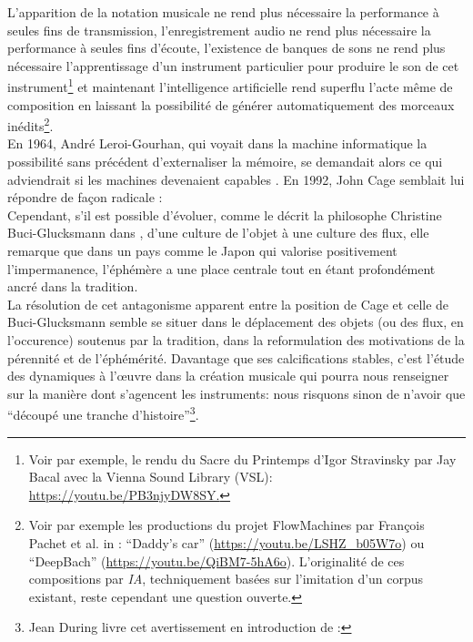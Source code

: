 \noindent L’apparition de la notation musicale ne rend plus nécessaire la performance à seules fins de transmission, l’enregistrement audio ne rend plus nécessaire la performance à seules fins d’écoute, l’existence de banques de sons ne rend plus nécessaire l’apprentissage d’un instrument particulier pour produire le son de cet instrument\footnote{Voir par exemple, le rendu du Sacre du Printemps d'Igor Stravinsky par Jay Bacal avec la Vienna Sound Library (VSL): \url{https://youtu.be/PB3njyDW8SY.}} et maintenant l’intelligence artificielle rend superflu l'acte même de composition en laissant la possibilité de générer automatiquement des morceaux inédits\footnote{Voir par exemple les productions du projet FlowMachines par François Pachet et al. in \cite{hadjeres_deepbach:_2016}: “Daddy's car” (\url{https://youtu.be/LSHZ_b05W7o}) ou “DeepBach” (\url{https://youtu.be/QiBM7-5hA6o}). L'originalité de ces compositions par \textit{IA}, techniquement basées sur l'imitation d'un corpus existant, reste cependant une question ouverte.}.\\
\indent En 1964, André Leroi-Gourhan, qui voyait dans la machine informatique la possibilité sans précédent d'externaliser la mémoire, se demandait alors ce qui adviendrait si les machines devenaient capables  \cite{leroi-gourhan_geste_1964}. En 1992, John Cage semblait lui répondre de façon radicale :  \cite{sebestik_ecoute_1992}\\
\indent Cependant, s'il est possible d'évoluer, comme le décrit la philosophe Christine Buci-Glucksmann dans \cite{buci-glucksmann_esthetique_2003}, d'une culture de l'objet à une culture des flux, elle remarque que dans un pays comme le Japon qui valorise positivement l'impermanence, l'éphémère a une place centrale tout en étant profondément ancré dans la tradition.\\
\indent La résolution de cet antagonisme apparent entre la position de Cage et celle de Buci-Glucksmann semble se situer dans le déplacement des objets (ou des flux, en l'occurence) soutenus par la tradition, dans la reformulation des motivations de la pérennité et de l'éphémérité. Davantage que ses calcifications stables, c'est l'étude des dynamiques à l'œuvre dans la création musicale qui pourra nous renseigner sur la manière dont s'agencent les instruments: nous risquons sinon de n'avoir que ``découpé une tranche d'histoire''\footnote{Jean During livre cet avertissement en introduction de \cite{during_quelque_1994} : }.

